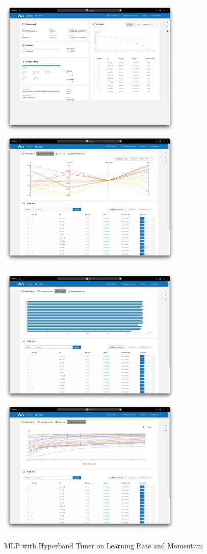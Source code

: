 \documentclass{article}
\begin{document}
\begin{figure}
	\centerline{\includegraphics[width=3.5in]{../proj3/figures/mlp_hyperband_overview.png}\includegraphics[width=3.5in]{../proj3/figures/mlp_hyperband_hyperparameter.png}}
	\centerline{\includegraphics[width=3.5in]{../proj3/figures/mlp_hyperband_latency.png}\includegraphics[width=3.5in]{../proj3/figures/mlp_hyperband_intermediate.png}}
	\caption{MLP with Hyperband Tuner on Learning Rate and Momentum}
	\label{fig:mlp-hyperband}
\end{figure}
\end{document}
